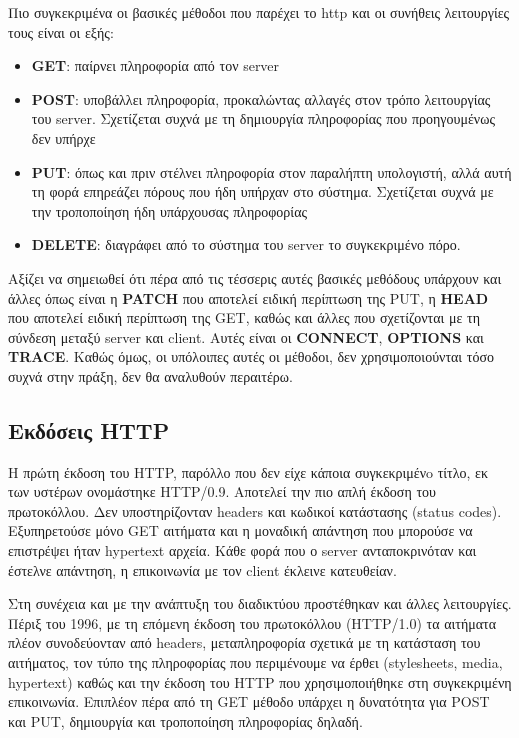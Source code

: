 Πιο συγκεκριμένα οι βασικές μέθοδοι που παρέχει το http και οι συνήθεις λειτουργίες τους είναι οι εξής:

\begin{itemize}
	\item \textbf{GET}: παίρνει πληροφορία από τον server
	\item \textbf{POST}: υποβάλλει πληροφορία, προκαλώντας αλλαγές στον τρόπο λειτουργίας του server. Σχετίζεται συχνά με τη δημιουργία πληροφορίας που προηγουμένως δεν υπήρχε 
	\item \textbf{PUT}: όπως και πριν στέλνει πληροφορία στον παραλήπτη υπολογιστή, αλλά αυτή τη φορά επηρεάζει πόρους που ήδη υπήρχαν στο σύστημα. Σχετίζεται συχνά με την τροποποίηση ήδη υπάρχουσας πληροφορίας
	\item \textbf{DELETE}: διαγράφει από το σύστημα του server το συγκεκριμένο πόρο.
\end{itemize}

Αξίζει να σημειωθεί ότι πέρα από τις τέσσερις αυτές βασικές μεθόδους υπάρχουν και άλλες όπως είναι 
η \textbf{PATCH} που αποτελεί ειδική περίπτωση της PUT, η \textbf{HEAD} που αποτελεί ειδική περίπτωση της GET,
καθώς και άλλες που σχετίζονται με τη σύνδεση μεταξύ server και client. Αυτές είναι οι \textbf{CONNECT}, \textbf{OPTIONS} και \textbf{TRACE}.
Καθώς όμως, οι υπόλοιπες αυτές οι μέθοδοι, δεν χρησιμοποιούνται τόσο συχνά στην πράξη, δεν θα αναλυθούν περαιτέρω.

\subsection{Εκδόσεις HTTP}
\label{subsec:http_versions}

Η πρώτη έκδοση του HTTP, παρόλλο που δεν είχε κάποια συγκεκριμένo τίτλο, εκ των υστέρων ονομάστηκε 
HTTP/0.9. Αποτελεί την πιο απλή έκδοση του πρωτοκόλλου. Δεν υποστηρίζονταν headers και κωδικοί κατάστασης (status codes).
Εξυπηρετούσε μόνο GET αιτήματα και η μοναδική απάντηση που μπορούσε να επιστρέψει ήταν hypertext αρχεία. Kάθε φορά που ο server ανταποκρινόταν και έστελνε
απάντηση, η επικοινωνία με τον client έκλεινε κατευθείαν.

Στη συνέχεια και με την ανάπτυξη του διαδικτύου προστέθηκαν και άλλες λειτουργίες. Πέριξ του 1996,
με τη επόμενη έκδοση του πρωτοκόλλου (HTTP/1.0) τα αιτήματα πλέον συνοδεύονταν από headers, μεταπληροφορία σχετικά
με τη κατάσταση του αιτήματος, τον τύπο της πληροφορίας που περιμένουμε να έρθει (stylesheets, media, hypertext) καθώς και 
την έκδοση του HTTP που χρησιμοποιήθηκε στη συγκεκριμένη επικοινωνία. Επιπλέον πέρα από τη GET μέθοδο υπάρχει η
δυνατότητα για POST και PUT, δημιουργία και τροποποίηση πληροφορίας δηλαδή.

